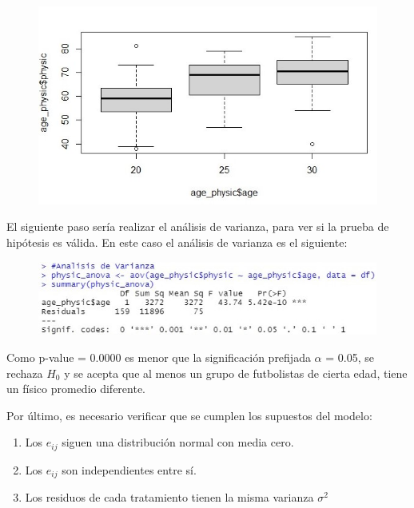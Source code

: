 \documentclass[a4paper,10pt,twocolumn]{article}
\begin{document}
\begin{figure}[h]
	\includegraphics[scale=0.55]{./imgs/anova_boxplot.jpg}
\end{figure}

El siguiente paso sería realizar el análisis de varianza, para ver si la prueba de hipótesis es válida. En este
caso el análisis de varianza es el siguiente:

\begin{figure}[h]
	\includegraphics[scale=0.55]{./imgs/anova_summary.jpg}
\end{figure}

Como p-value = 0.0000 es menor que la significación prefijada $\alpha$ = 0.05, se rechaza $H_{0}$ y se acepta que al menos un grupo de futbolistas de cierta edad, tiene un físico promedio diferente. 

Por último, es necesario verificar que se cumplen los supuestos del modelo:
\begin{enumerate}
	\item Los $e_{ij}$ siguen una distribución normal con media cero.
	\item Los $e_{ij}$ son independientes entre sí.
	\item Los residuos de cada tratamiento tienen la misma varianza $\sigma^{2}$
\end{enumerate}
\end{document}
